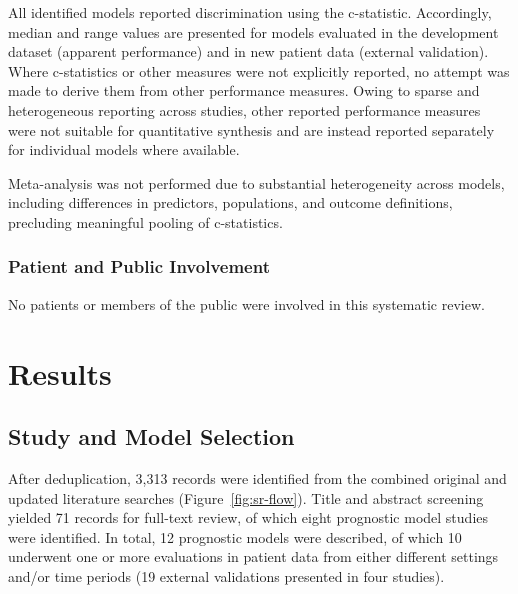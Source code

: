All identified models reported discrimination using the c-statistic. Accordingly, median and range values are presented for models evaluated in the development dataset (apparent performance) and in new patient data (external validation). Where c-statistics or other measures were not explicitly reported, no attempt was made to derive them from other performance measures. Owing to sparse and heterogeneous reporting across studies, other reported performance measures were not suitable for quantitative synthesis and are instead reported separately for individual models where available.

Meta-analysis was not performed due to substantial heterogeneity across models, including differences in predictors, populations, and outcome definitions, precluding meaningful pooling of c-statistics.

\subsubsection{Patient and Public Involvement}

No patients or members of the public were involved in this systematic review.

\section{Results}

\subsection{Study and Model Selection}

After deduplication, 3,313 records were identified from the combined original and updated literature searches (Figure~\ref{fig:sr-flow}). Title and abstract screening yielded 71 records for full-text review, of which eight prognostic model studies were identified\cite{abongomeraDevelopmentExternalValidation2017,costaPredictingDeathKalaazar2016,coura-vitalPrognosticFactorsScoring2014,werneckPrognosticFactorsDeath2003,dearaujoEarlyClinicalManifestations2012,sampaioRiskFactorsDeath2010,kaminkClinicalSeverityScoring2017,foinquinosTemporalValidationPredictive2021}. In total, 12 prognostic models were described, of which 10 underwent one or more evaluations in patient data from either different settings and/or time periods (19 external validations presented in four studies)\cite{abongomeraDevelopmentExternalValidation2017,costaPredictingDeathKalaazar2016,kaminkClinicalSeverityScoring2017,foinquinosTemporalValidationPredictive2021}.

